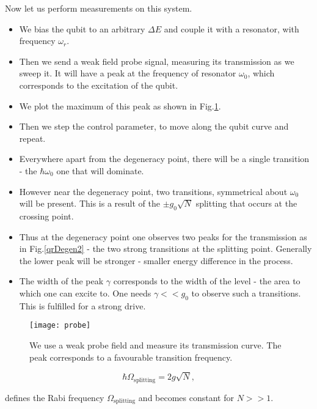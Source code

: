 Now  let  us  perform  measurements  on  this
system.

\begin{itemize}
\item  We  bias  the qubit  to  an  arbitrary
  $ \Delta  E $  and couple  it with  a resonator,
  with frequency $ \omega_r $.
\item Then we send a weak field probe signal,
  measuring its transmission  as we sweep it.
  It  will have  a peak  at the  frequency of
  resonator $  \omega_0 $,  which corresponds
  to the excitation of the qubit.
\item  We plot  the maximum  of this  peak as
  shown in Fig.\ref{qrProbe}.
\item Then we step  the control parameter, to
  move along the qubit curve and repeat.
\item  Everywhere apart  from the  degeneracy
  point, there will be  a single transition -
  the  $   \hbar\omega_0  $  one   that  will
  dominate.
\item However near  the degeneracy point, two
  transitions, symmetrical about $ \omega_0 $
  will be  present.  This is a  result of the
  $ \pm  g_0\sqrt{N} $ splitting  that occurs
  at the crossing point.
\item  Thus  at   the  degeneracy  point  one
  observes two peaks  for the transmission as
  in  Fig.\ref{qrDegen2}  -  the  two  strong
  transitions   at   the   splitting   point.
  Generally the lower peak will be stronger -
  smaller energy difference in the process.
\item The width of the peak $ \gamma $ corresponds
  to the  width of  the level  - the  area to
  which  one   can  excite  to.    One  needs
  $   \gamma<<g_0  $   to   observe  such   a
  transitions.   This  is   fulfilled  for  a
  strong drive.
\end{itemize}

\begin{figure}
  \centering
  \texttt{[image: probe]}
  \caption{We  use  a  weak probe  field  and
    measure its transmission curve.  The peak
    corresponds  to  a favourable  transition
    frequency. \label{qrProbe}}
\end{figure}

\begin{framed}\noindent
  \begin{equation}
    \hbar\Omega_\text{splitting}            =
    2g\sqrt{N},
  \end{equation}

  \noindent   defines   the  Rabi   frequency
  $  \Omega_\text{splitting}  $  and  becomes
  constant for $N>>1$.
\end{framed}

